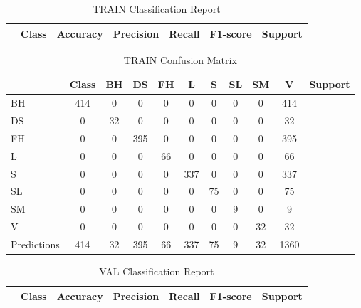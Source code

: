 \begin{table}[h]
\centering
\begin{tabular}{|l|c|c|c|c|c|} \hline
 & Class & Accuracy & Precision & Recall & F1-score & Support \\ \hline
\end{tabular}
\caption{TRAIN Classification Report}
\label{tab:train_report}
\end{table}

\begin{table}[h]
\centering
\begin{tabular}{|l|c|c|c|c|c|c|c|c|c|} \hline
 & Class & BH & DS & FH & L & S & SL & SM & V & Support \\ \hline
BH & 414 & 0 & 0 & 0 & 0 & 0 & 0 & 0 & 414 \\ \hline
DS & 0 & 32 & 0 & 0 & 0 & 0 & 0 & 0 & 32 \\ \hline
FH & 0 & 0 & 395 & 0 & 0 & 0 & 0 & 0 & 395 \\ \hline
L & 0 & 0 & 0 & 66 & 0 & 0 & 0 & 0 & 66 \\ \hline
S & 0 & 0 & 0 & 0 & 337 & 0 & 0 & 0 & 337 \\ \hline
SL & 0 & 0 & 0 & 0 & 0 & 75 & 0 & 0 & 75 \\ \hline
SM & 0 & 0 & 0 & 0 & 0 & 0 & 9 & 0 & 9 \\ \hline
V & 0 & 0 & 0 & 0 & 0 & 0 & 0 & 32 & 32 \\ \hline
Predictions & 414 & 32 & 395 & 66 & 337 & 75 & 9 & 32 & 1360 \\ \hline
\end{tabular}
\caption{TRAIN Confusion Matrix}
\label{tab:train_conf_matrix}
\end{table}

\begin{table}[h]
\centering
\begin{tabular}{|l|c|c|c|c|c|} \hline
 & Class & Accuracy & Precision & Recall & F1-score & Support \\ \hline
\end{tabular}
\caption{VAL Classification Report}
\label{tab:val_report}
\end{table}

